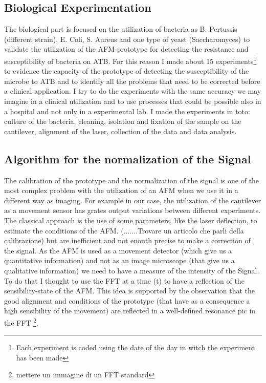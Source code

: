 \documentclass[11pt, a4paper]{article}
\begin{document}
\subsection{Biological Experimentation}%
The biological part is focused on the utilization of bacteria as B. Pertussis (different strain), E. Coli, S. Aureus and one type of yeast (Saccharomyces) to validate the utilization of the AFM-prototype for detecting the resistance and susceptibility of bacteria on ATB. For this reason I made about 15 experiments\footnote{Each experiment is coded using the date of the day in witch the experiment has been made} to evidence the capacity of the prototype of detecting the susceptibility of the microbe to ATB and to identify all the problems that need to be corrected before a clinical application. 
I try to do the experiments with the same accuracy we may imagine in a clinical utilization and to use processes that could be possible also in a hospital and not only in a experimental lab. 
I made the experiments in toto: culture of the bacteria, cleaning, isolation and fixation of the sample on the cantilever, alignment of the laser, collection of the data and data analysis. 


\subsection{Algorithm for the normalization of the Signal} %
The calibration of the prototype and the normalization of the signal is one of the most complex problem with the utilization of an AFM when we use it in a different way as imaging. For example in our case, the utilization of the cantilever as a movement sensor has grates output variations between different experiments.
The classical approach is the use of some parameters, like the laser deflection, to estimate the conditions of the AFM. (.......Trovare un articolo che parli della calibrazione) but are inefficient and not enouth precise to make a correction of the signal. 
As the AFM is used as a movement detector (which give us a quantitative information) and not as an image microscope (that give us a qualitative information) we need to have a measure of the intensity of the Signal. To do that I thought to use the FFT at a time (t) to have a reflection of the sensibility-state of the AFM. This idea is supported by the observation that the good alignment and conditions of the prototype (that have as a consequence a high sensibility of the movement) are reflected in a well-defined resonance pic in the FFT \footnote{mettere un immagine di un FFT standard}. 
\end{document}
